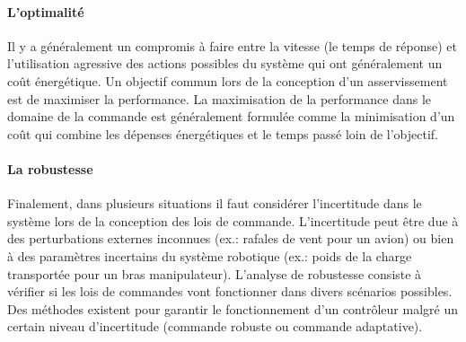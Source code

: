\paragraph{L'optimalité}

Il y a généralement un compromis à faire entre la vitesse (le temps de réponse) et l'utilisation agressive des actions possibles du système qui ont généralement un coût énergétique. Un objectif commun lors de la conception d'un asservissement est de maximiser la performance. La maximisation de la performance dans le domaine de la commande est généralement formulée comme la minimisation d'un coût qui combine les dépenses énergétiques et le temps passé loin de l'objectif.

\paragraph{La robustesse} Finalement, dans plusieurs situations il faut considérer l'incertitude dans le système lors de la conception des lois de commande. L'incertitude peut être due à des perturbations externes inconnues (ex.: rafales de vent pour un avion) ou bien à des paramètres incertains du système robotique (ex.: poids de la charge transportée pour un bras manipulateur). L'analyse de robustesse consiste à vérifier si les lois de commandes vont fonctionner dans divers scénarios possibles. Des méthodes existent pour garantir le fonctionnement d'un contrôleur malgré un certain niveau d'incertitude (commande robuste ou commande adaptative).

